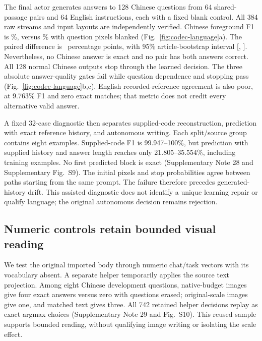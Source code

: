 The final actor generates answers to 128 Chinese questions from 64
shared-passage pairs and 64 English instructions, each with a fixed blank
control. All 384 raw streams and input layouts are independently verified.
Chinese foreground F1 is \CodecLanguageFOne\%, versus
\CodecLanguageBlankFOne\% with question pixels blanked
(Fig.~\ref{fig:codec-language}a). The paired difference is
\CodecLanguageQuestionGain\ percentage points, with 95\% article-bootstrap
interval [\CodecLanguageCILow, \CodecLanguageCIHigh]. Nevertheless, no
Chinese answer is exact and no pair has both answers correct. All 128 normal
Chinese outputs stop through the learned decision. The three absolute
answer-quality gates fail while question dependence and stopping pass
(Fig.~\ref{fig:codec-language}b,c). English recorded-reference agreement is
also poor, at 9.763\% F1 and zero exact matches; that metric does not credit
every alternative valid answer.

A fixed 32-case diagnostic then separates supplied-code reconstruction,
prediction with exact reference history, and autonomous writing. Each
split/source group contains eight examples. Supplied-code F1 is
99.947--100\%, but prediction with supplied history and answer length reaches
only 21.805--35.554\%, including training examples. No first predicted block
is exact (Supplementary Note 28 and Supplementary Fig.~S9).
The initial pixels and stop probabilities agree between paths starting from
the same prompt. The failure therefore precedes generated-history drift.
This assisted diagnostic does not identify a unique learning repair or qualify
language; the original autonomous decision remains rejection.


\subsection*{Numeric controls retain bounded visual reading}
We test the original imported body through numeric chat/task vectors with
its vocabulary absent. A separate helper temporarily applies the source text
projection. Among eight Chinese development questions, native-budget images
give four exact answers versus zero with questions erased; original-scale
images give one, and matched text gives three. All 742 retained helper
decisions replay as exact argmax choices (Supplementary Note 29 and Fig.~S10). This reused
sample supports bounded reading, without qualifying image writing or
isolating the scale effect.

